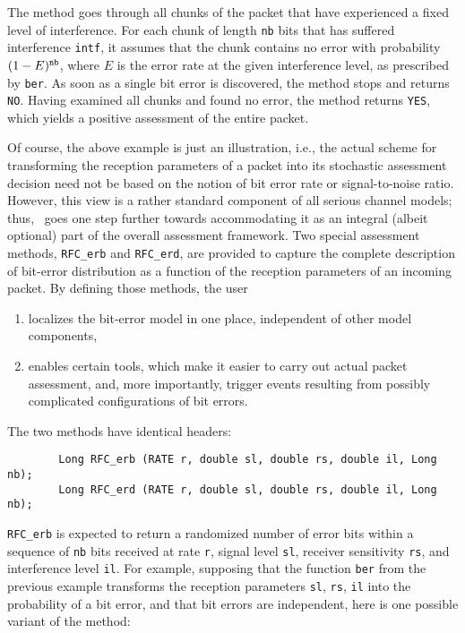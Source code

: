 \noindent
The method goes through all chunks of the packet that have experienced a fixed
level of interference.
For each chunk of length {\tt nb} bits that has suffered interference
{\tt intf}, it assumes that the chunk contains no error with probability
$(1-E)^{\tt nb}$, where $E$ is the error rate at the given interference level,
as prescribed by {\tt ber}.
As soon as a single bit error is discovered, the method stops and returns
{\tt NO}.
Having examined all chunks and found no error, the method returns {\tt YES},
which yields a positive assessment of the entire packet.

\medskip

Of course, the above example is just an illustration, i.e., the actual
scheme for transforming the reception parameters of a packet
into its stochastic assessment decision need not be based on the notion
of bit error rate or signal-to-noise ratio.
However, this view is a rather standard component of all serious channel
models; thus, \smurph\ goes one step further towards accommodating it
as an integral (albeit optional) part of the overall assessment framework.
Two special assessment methods, {\tt RFC\_erb} and {\tt RFC\_erd}, are
provided to capture the complete description of bit-error distribution as
a function of the reception parameters of an incoming packet.
By defining those methods, the user

\begin{enumerate}
\item
localizes the bit-error model in one place, independent of other
model components,
\item
enables certain tools, which make it easier to carry out actual packet
assessment, and, more importantly, trigger events resulting from possibly
complicated configurations of bit errors.
\end{enumerate}

The two methods have identical headers:
\begin{verbatim}
        Long RFC_erb (RATE r, double sl, double rs, double il, Long nb);
        Long RFC_erd (RATE r, double sl, double rs, double il, Long nb);
\end{verbatim}
\noindent
{\tt RFC\_erb}
is expected to return a randomized number of error bits within a
sequence of {\tt nb} bits received at rate {\tt r},
signal level {\tt sl},
receiver sensitivity {\tt rs}, and interference level {\tt il}.
For example, supposing that the function {\tt ber} from the previous example
transforms the reception parameters {\tt sl}, {\tt rs}, {\tt il}
into the probability of a
bit error, and that bit errors are independent, here is one possible
variant of the method:

